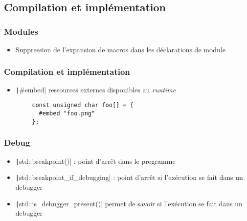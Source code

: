 \documentclass[C++.tex]{subfiles}
\begin{document}
\subsection*{Compilation et implémentation}
\begin{frame}[fragile]
	\frametitle{Modules}
	\begin{itemize}
		\item Suppression de l'expansion de macros dans les déclarations de module
	\end{itemize}

\end{frame}

\begin{frame}[fragile]
	\frametitle{Compilation et implémentation}
	\begin{itemize}
		\item \texttt|#embed| ressources externes disponibles au \textit{runtime}
	\end{itemize}

	\begin{verbatim}
		const unsigned char foo[] = {
		  #embed "foo.png"
		};
	\end{verbatim}

\end{frame}

\begin{frame}[fragile]
	\frametitle{Debug}
	\begin{itemize}
		\item \texttt|std::breakpoint()| : point d'arrêt dans le programme
		\item \texttt|std::breakpoint_if_debugging| : point d'arrêt si l'exécution se fait dans un debugger
		\item \texttt|std::is_debugger_present()| permet de savoir si l'exécution se fait dans un debugger
	\end{itemize}

\end{frame}
\end{document}
